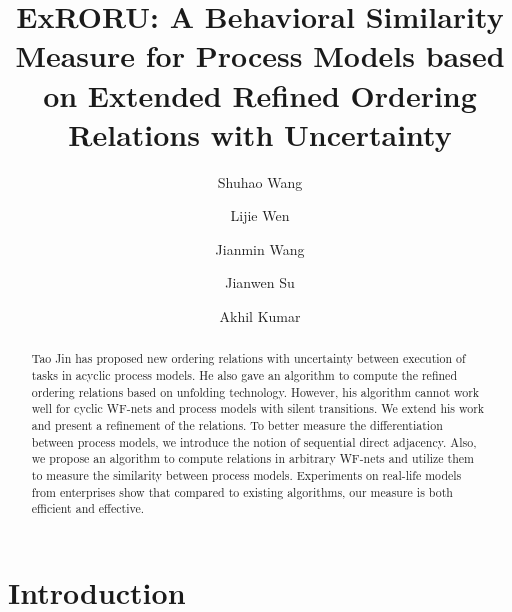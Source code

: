 \documentclass{llncs}
\begin{document}
\frontmatter 
\pagestyle{headings}

\mainmatter
\title{ExRORU: A Behavioral Similarity Measure for Process Models based on Extended Refined Ordering Relations with Uncertainty}

\author[$1$]{Shuhao Wang}
\author[$1$]{Lijie Wen}
\author[$1$]{Jianmin Wang}
\author[$2$]{Jianwen Su}
\author[$3$]{Akhil Kumar}
\institute{}

\maketitle

\begin{abstract}
Tao Jin has proposed new ordering relations with uncertainty between execution of tasks in acyclic process models. He also gave an algorithm to compute the refined ordering relations based on unfolding technology. However, his algorithm cannot work well for cyclic WF-nets and process models with silent transitions. We extend his work and present a refinement of the relations. To better measure the differentiation between process models, we introduce the notion of sequential direct adjacency. Also, we propose an algorithm to compute relations in arbitrary WF-nets and utilize them to measure the similarity between process models. Experiments on real-life models from enterprises show that compared to existing algorithms, our measure is both efficient and effective.
\end{abstract}

\section{Introduction}\label{sec:introduction}
\end{document}
